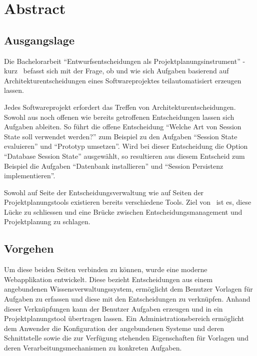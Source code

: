 \chapter{Abstract}

	\section{Ausgangslage}

	Die Bachelorarbeit ``Entwurfsentscheidungen als Projektplanungsinstrument'' - kurz \eeppi\ befasst sich mit der Frage,
	ob und wie sich Aufgaben basierend auf Architekturentscheidungen eines Softwareprojektes teilautomatisiert erzeugen lassen.

	Jedes Softwareprojekt erfordert das Treffen von Architekturentscheidungen.
	Sowohl aus noch offenen wie bereits getroffenen Entscheidungen lassen sich Aufgaben ableiten.
	So führt die offene Entscheidung ``Welche Art von Session State soll verwendet werden?'' zum Beispiel zu den Aufgaben
	``Session State evaluieren'' und ``Prototyp umsetzen''.
	Wird bei dieser Entscheidung die Option ``Database Session State'' ausgewählt,
	so resultieren aus diesem Entscheid zum Beispiel die Aufgaben ``Datenbank installieren'' und
	``Session Persistenz implementieren''.

	Sowohl auf Seite der Entscheidungsverwaltung wie auf Seiten der Projektplanungstools existieren bereits verschiedene Tools.
	Ziel von \eeppi\ ist es, diese Lücke zu schliessen und eine Brücke zwischen Entscheidungsmanagement und Projektplanung zu schlagen.

	\section{Vorgehen}

	Um diese beiden Seiten verbinden zu können, wurde eine moderne Webapplikation entwickelt.
	Diese bezieht Entscheidungen aus einem angebundenen Wissensverwaltungssystem,
	ermöglicht dem Benutzer Vorlagen für Aufgaben zu erfassen und diese mit den Entscheidungen zu verknüpfen.
	Anhand dieser Verknüpfungen kann der Benutzer Aufgaben erzeugen und in ein Projektplanungstool übertragen lassen.
	Ein Administrationsbereich ermöglicht dem Anwender die Konfiguration der angebundenen Systeme und deren Schnittstelle sowie
	die zur Verfügung stehenden Eigenschaften für Vorlagen und deren Verarbeitungsmechanismen zu konkreten Aufgaben.

